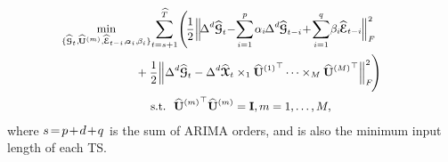 \documentclass[letterpaper]{article} %
\numberwithin{theorem}{section}
\newcommand{\ten}[1]{ \boldsymbol{\mathcal #1}}
\begin{document}
\begin{equation}\label{HTARIMA_XG1}
\small 
\begin{aligned}
&\hspace{-0.4cm} \mathop{\min}_{ \{\widehat{\ten{G}}_t,\hspace{-0.03cm} \widehat{\mathbf U}{^{(m)}}, \hspace{-0.01cm}  \widehat{\ten{E}}_{t-i}, \hspace{-0.03cm} \alpha_i, \hspace{-0.03cm} \beta_i  \}}   \hspace{-0.05cm}\sum_{t=s+1}^{\widehat{T}}\hspace{-0.05cm}  \Bigg (\hspace{-0.05cm} \frac{1}{2} \Big \|  \hspace{-0.05cm}  {\Delta^d   \widehat{\ten{G}}_t} \hspace{-0.07cm}  - \hspace{-0.07cm} \sum_{i=1}^{p} \hspace{-0.03cm} \alpha_i \hspace{-0.03cm} {\Delta^d  \hspace{-0.01cm}  \widehat{\ten{G}}_{t-i}}   \hspace{-0.06cm}  + \hspace{-0.05cm}  \sum_{i=1}^{q}  \hspace{-0.05cm}  \beta_i  \hspace{-0.03cm}  {\widehat{\ten{E}}_{t-i}} \hspace{-0.03cm}  \Big {\|} _F^2  \\ & \ \ \ \ \ \ \ \ \ \ \ \ \ \ \ \  + \frac{1}{2}  \Big \| {\Delta^d   \widehat{\ten{G}}_t}    - {\Delta^d  \widehat{\ten{X}}_t}  \times_1  \widehat{\mathbf U}{^{(1)}}^\top   \cdots \times_M  \widehat{\mathbf U}{^{(M)}}^\top \Big  \| _F^2 \hspace{-0.05cm}  \Bigg)  \ \ \\ &  \ \ \ \ \ \ \ \ \ \ \   \ \ \ \ \ \ \ \  \  \text{s.t.}  \ \ \widehat{ \mathbf U}{^{(m)}}^\top \widehat{ \mathbf U}{^{(m)}} = \mathbf I, m=1,\ldots, M, 
\end{aligned}
\end{equation}
where $s\hspace{-0.05cm} = \hspace{-0.05cm}p\hspace{-0.05cm}+\hspace{-0.05cm}d\hspace{-0.05cm}+\hspace{-0.05cm}q$ is the sum of  ARIMA orders, and  is also the minimum input length of each  TS.
\end{document}
